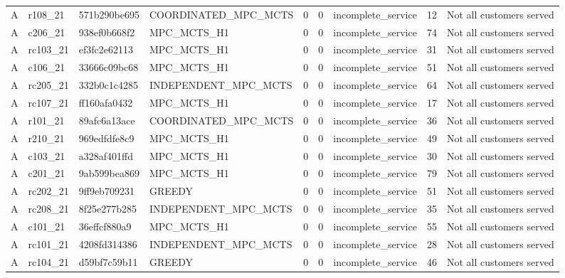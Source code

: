 \begin{table}
{\begin{tabular}{llllrrlrl}
A & r108\_21 & 571b290be695 & COORDINATED\_MPC\_MCTS & 0 & 0 & incomplete\_service & 12 & Not all customers served \\
A & c206\_21 & 938ef0b668f2 & MPC\_MCTS\_H1 & 0 & 0 & incomplete\_service & 74 & Not all customers served \\
A & rc103\_21 & ef3fc2e62113 & MPC\_MCTS\_H1 & 0 & 0 & incomplete\_service & 31 & Not all customers served \\
A & c106\_21 & 33666c09bc68 & MPC\_MCTS\_H1 & 0 & 0 & incomplete\_service & 51 & Not all customers served \\
A & rc205\_21 & 332b0c1c4285 & INDEPENDENT\_MPC\_MCTS & 0 & 0 & incomplete\_service & 64 & Not all customers served \\
A & rc107\_21 & ff160afa0432 & MPC\_MCTS\_H1 & 0 & 0 & incomplete\_service & 17 & Not all customers served \\
A & r101\_21 & 89afc6a13ace & COORDINATED\_MPC\_MCTS & 0 & 0 & incomplete\_service & 36 & Not all customers served \\
A & r210\_21 & 969edfdfe8c9 & MPC\_MCTS\_H1 & 0 & 0 & incomplete\_service & 49 & Not all customers served \\
A & c103\_21 & a328af401ffd & MPC\_MCTS\_H1 & 0 & 0 & incomplete\_service & 30 & Not all customers served \\
A & c201\_21 & 9ab599bea869 & MPC\_MCTS\_H1 & 0 & 0 & incomplete\_service & 79 & Not all customers served \\
A & rc202\_21 & 9ff9eb709231 & GREEDY & 0 & 0 & incomplete\_service & 51 & Not all customers served \\
A & rc208\_21 & 8f25e277b285 & INDEPENDENT\_MPC\_MCTS & 0 & 0 & incomplete\_service & 35 & Not all customers served \\
A & c101\_21 & 36effcf880a9 & MPC\_MCTS\_H1 & 0 & 0 & incomplete\_service & 55 & Not all customers served \\
A & rc101\_21 & 4208fd314386 & INDEPENDENT\_MPC\_MCTS & 0 & 0 & incomplete\_service & 28 & Not all customers served \\
A & rc104\_21 & d59bf7c59b11 & GREEDY & 0 & 0 & incomplete\_service & 46 & Not all customers served \\
\bottomrule
\end{tabular}
}
\end{table}
